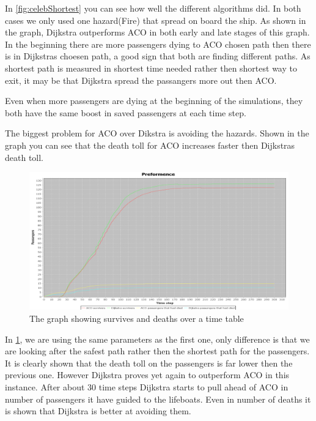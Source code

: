 In \ref{fig:celebShortest} you can see how well the different algorithms did. In both cases we only used one hazard(Fire) that spread on board the ship. As shown in the graph, Dijkstra outperforms ACO in both early and late stages of this graph. In the beginning there are more passengers dying to ACO chosen path then there is in Dijkstras choesen path, a good sign that both are finding different paths. As shortest path is measured in shortest time needed rather then shortest way to exit, it may be that Dijkstra spread the passangers more out then ACO.

Even when more passengers are dying at the beginning of the simulations, they both have the same boost in saved passengers at each time step.

The biggest problem for ACO over Dikstra is avoiding the hazards. Shown in the graph you can see that the death toll for ACO increases faster then Dijkstras death toll.

\begin{figure} [h]
\centering
\hspace*{-1.0in}
\includegraphics[scale=0.35]{images/Graph-using-200-rounds-140-passangers-and-safest-first-one-hazzard.png}
\caption{The graph showing survives and deaths over a time table}
\label{fig:celebSafty}
\end{figure}

In \ref{fig:celebSafty}, we are using the same parameters as the first one, only difference is that we are looking after the safest path rather then the shortest path for the passengers. It is clearly shown that the death toll on the passengers is far lower then the previous one.
However Dijkstra proves yet again to outperform ACO in this instance. After about 30 time steps Dijkstra starts to pull ahead of ACO in number of passengers it have guided to the lifeboats. Even in number of deaths it is shown that Dijkstra is better at avoiding them.

